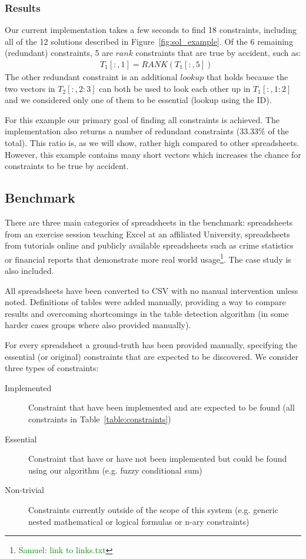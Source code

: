 \documentclass{ecai}
\newcommand{\samuel}[1]{\textcolor{green}{{\sc Samuel:} #1}\xspace}
\newcommand{\range}[3]{\ensuremath{#1[#2,#3]}}
\newcommand{\rangeto}[2]{#1{:}#2}
\newcommand{\rangeall}{:}
\newcommand{\eccalc}[2]{\ensuremath{#1 = #2}}
\newcommand{\ecrank}[2]{\eccalc{#1}{\mathit{RANK}(#2)}}
\begin{document}
\subsubsection{Results}
Our current implementation takes a few seconds to find 18 constraints, including all of the 12 solutions described in Figure~\ref{fig:sol_example}.
Of the 6 remaining (redundant) constraints, 5 are $\mathit{rank}$ constraints that are true by accident, such as: \begin{align*}
  & \ecrank{\range{T_1}{\rangeall}{1}}{\range{T_1}{\rangeall}{5}}
\end{align*}
The other redundant constraint is an additional $\mathit{lookup}$ that holds because the two vectors in \range{T_2}{\rangeall}{\rangeto{2}{3}} can both be used to look each other up in \range{T_1}{\rangeall}{\rangeto{1}{2}} and we considered only one of them to be essential (lookup using the ID).

For this example our primary goal of finding all constraints is achieved.
The implementation also returns a number of redundant constraints ($33.33\%$ of the total).
This ratio is, as we will show, rather high compared to other spreadsheets.
However, this example contains many short vectors which increases the chance for constraints to be true by accident.

\subsection{Benchmark}
There are three main categories of spreadsheets in the benchmark: spreadsheets from an exercise session teaching Excel at an affiliated University, spreadsheets from tutorials online and publicly available spreadsheets such as crime statistics or financial reports that demonstrate more real world usage\footnote{\samuel{link to links.txt}}.
The case study is also included.

All spreadsheets have been converted to CSV with no manual intervention unless noted.
Definitions of tables were added manually, providing a way to compare results and overcoming shortcomings in the table detection algorithm (in some harder cases groups where also provided manually).

For every spreadsheet a ground-truth has been provided manually, specifying the essential (or original) constraints that are expected to be discovered.
We consider three types of constraints:
\begin{description}
  \item[Implemented] Constraint that have been implemented and are expected to be found (all constraints in Table~\ref{table:constraints})
  \item[Essential] Constraint that have or have not been implemented but could be found using our algorithm (e.g. fuzzy conditional sum)
  \item[Non-trivial] Constraints currently outside of the scope of this system (e.g. generic nested mathematical or logical formulas or n-ary constraints)
\end{description}
\end{document}
